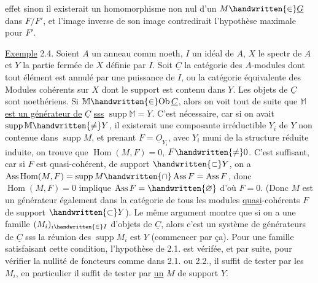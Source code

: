 effet sinon il existerait un homomorphisme non nul d'un $M\handwritten{\in}\underline G$ dans $F/F'$,
et l'image inverse  de son image  contredirait l'hypothèse maximale
pour $F'$.

\uline{Exemple} 2.4. Soient $A$ un anneau comm noeth, $I$ un idéal de $A$, $X$ le spectr
de $A$ et $Y$ la partie fermée de $X$ définie par $I$. Soit $\underline C$ la catégorie des
$A$-modules  dont tout élément est annulé par une puissance de $I$, ou la catégorie équivalente des Modules cohérents sur $X$ dont le support est
contenu dans $Y$. Les objets de $\underline C$ sont noethériens. Si $\mathbb M\handwritten{\in}\mathrm{Ob}\,\underline C$, alors on
voit tout de suite que $\mathbb M$ \uline{est un générateur de} $\underline C$ \uline{sss} $\operatorname{supp}\mathbb M=Y$. C'est
nécessaire, car si on avait $\operatorname{supp}\mathbb M\handwritten{\ne}Y$, il existerait une composante
irréductible $Y_i$ de $Y$ non contenue dans $\operatorname{supp}M$, et prenant $F=\underline O_{Y_i}$, avec
$Y_i$ muni de la structure réduite induite, on trouve que $\operatorname{Hom}(M,F)=0$, $F\handwritten{\ne}0$.
C'est suffisant, car si  $F$ est  quasi-cohérent, de support
$\handwritten{\subset}Y$, on a $\operatorname{Ass}\operatorname{Hom}(M,F)=\operatorname{supp}M\handwritten{\cap}\operatorname{Ass}F=\operatorname{Ass}F$, donc $\operatorname{Hom}(M,F)=0$ implique
$\operatorname{Ass}F=\handwritten{\varnothing}$ d'où $F=0$. \deleted{\unsure{(}}(Donc $M$ est un générateur également dans la catégorie de tous les modules \uline{quasi}-cohérents $F$ de support $\handwritten{\subset}Y$).  Le même argument montre que si on a une
famille $(M_i)_{i\handwritten{\in}I}$ d'objets de $\underline C$, alors c'est un système de générateurs de $\underline C$
sss la réunion des $\operatorname{supp}M_i$ est $Y$ (commencer par ça). Pour une famille
satisfaisant cette condition, l'hypothèse de 2.1. est vérifée, et par
suite, pour vérifier la nullité de foncteurs comme dans 2.1. ou 2.2.,
il suffit de tester par les $M_i$,  en particulier il suffit
de tester par \uline{un} $M$ de support $Y$.

